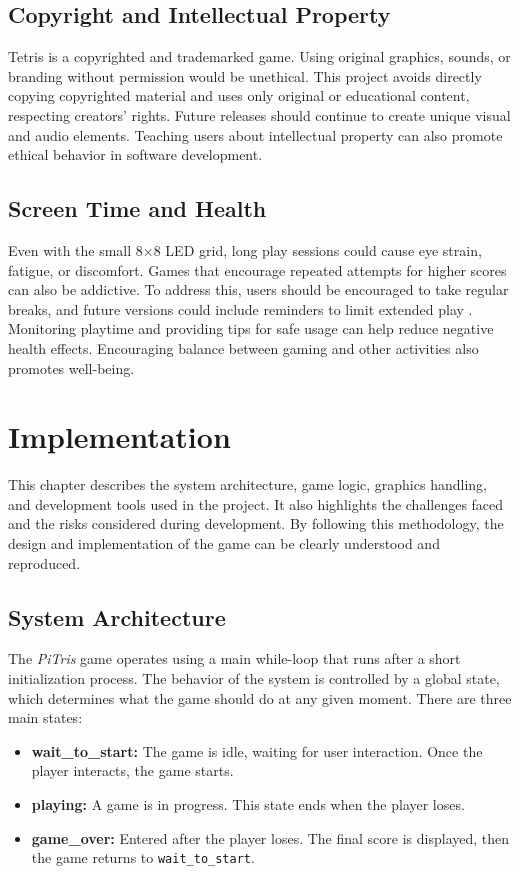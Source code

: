 \documentclass[11pt,titlepage,openright]{book}
\begin{document}
\section{Copyright and Intellectual Property}
Tetris is a copyrighted and trademarked game. Using original graphics, sounds, or branding without permission would be unethical. This project avoids directly copying copyrighted material and uses only original or educational content, respecting creators’ rights. Future releases should continue to create unique visual and audio elements. Teaching users about intellectual property can also promote ethical behavior in software development.

\section{Screen Time and Health}
Even with the small 8×8 LED grid, long play sessions could cause eye strain, fatigue, or discomfort. Games that encourage repeated attempts for higher scores can also be addictive. To address this, users should be encouraged to take regular breaks, and future versions could include reminders to limit extended play \cite{Ferguson2017}. Monitoring playtime and providing tips for safe usage can help reduce negative health effects. Encouraging balance between gaming and other activities also promotes well-being.

\chapter{Implementation}
This chapter describes the system architecture, game logic, graphics handling, and development tools used in the project. It also highlights the challenges faced and the risks considered during development. By following this methodology, the design and implementation of the game can be clearly understood and reproduced.

\section{System Architecture}
The \textit{PiTris} game operates using a main while-loop that runs after a short initialization process. The behavior of the system is controlled by a global state, which determines what the game should do at any given moment. There are three main states:

\begin{itemize}
    \item \textbf{wait\_to\_start:} The game is idle, waiting for user interaction. Once the player interacts, the game starts.
    \item \textbf{playing:} A game is in progress. This state ends when the player loses.
    \item \textbf{game\_over:} Entered after the player loses. The final score is displayed, then the game returns to \texttt{wait\_to\_start}.
\end{itemize}
\end{document}
